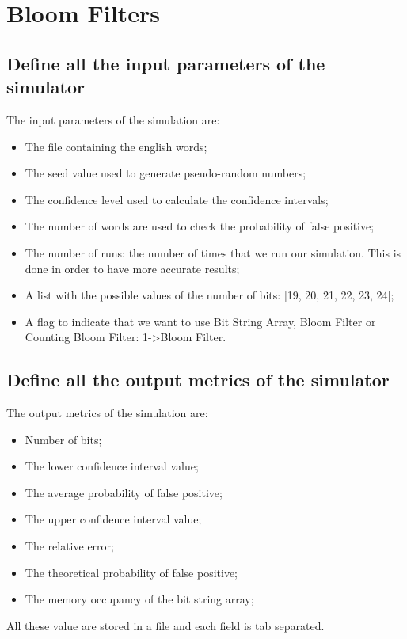 \documentclass{report}
\begin{document}
{		
					\section{Bloom Filters}	 
	 
				\subsection{Define all the input parameters of the simulator}
					The input parameters of the simulation are:
					\begin{itemize}
						\item The file containing the english words;
						\item The seed value used to generate pseudo-random numbers;
						\item The confidence level used to calculate the confidence intervals;
						\item The number of words are used to check the probability of false positive;
						\item The number of runs: the number of times that we run our simulation. This is done in order to have more accurate results;
						\item A list with the possible values of the number of bits: [19, 20, 21, 22, 23, 24];
						\item A flag to indicate that we want to use Bit String Array, Bloom Filter or Counting Bloom Filter: 1->Bloom Filter.
					\end{itemize}
					 
				\subsection{Define all the output metrics of the simulator}
				The output metrics of the simulation are:
				\begin{itemize}
					\item Number of bits;
					\item The lower confidence interval value;
					\item The average probability of false positive;
					\item The upper confidence interval value;
					\item The relative error;
					\item The theoretical probability of false positive;
					\item The memory occupancy of the bit string array;
				\end{itemize}
				All these value are stored in a file and each field is tab separated.
			
}
\end{document}
